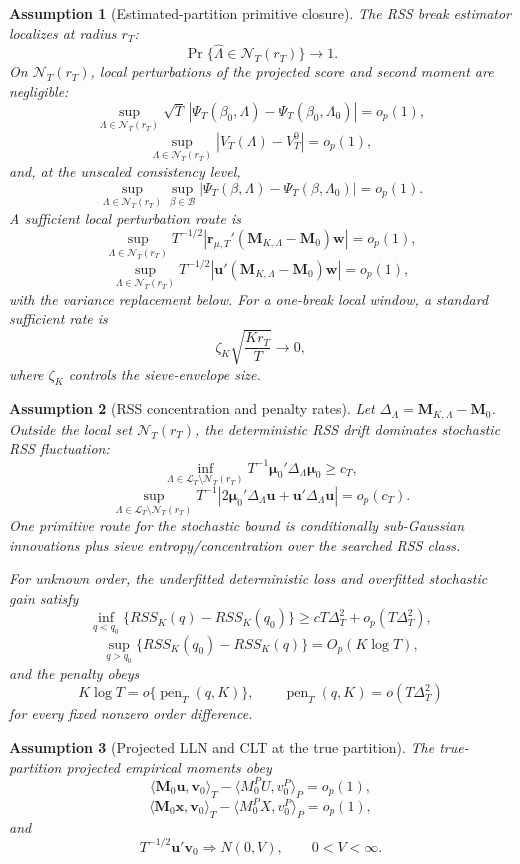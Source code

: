\documentclass[12pt]{article}
\numberwithin{equation}{section}
\newtheorem{assumption}{Assumption}
\theoremstyle{definition}
\newcommand{\op}{o_p}
\newcommand{\Op}{O_p}
\newcommand{\innerT}[2]{\langle #1,#2\rangle_T}
\newcommand{\innerP}[2]{\langle #1,#2\rangle_P}
\begin{document}
\begin{assumption}[Estimated-partition primitive closure]
\label{ass:directional-break-replacement}
The RSS break estimator localizes at radius \(r_T\):
\[
    \Pr\{\widehat\Lambda\in\mathcal N_T(r_T)\}\to1.
\]
On \(\mathcal N_T(r_T)\), local perturbations of the projected score and second
moment are negligible:
\[
    \sup_{\Lambda\in\mathcal N_T(r_T)}
    \sqrt T\,|\Psi_T(\beta_0,\Lambda)-\Psi_T(\beta_0,\Lambda_0)|=\op(1),
\]
\[
    \sup_{\Lambda\in\mathcal N_T(r_T)}
    |V_T(\Lambda)-V_T^0|=\op(1),
\]
and, at the unscaled consistency level,
\[
    \sup_{\Lambda\in\mathcal N_T(r_T)}\sup_{\beta\in\mathcal B}
    |\Psi_T(\beta,\Lambda)-\Psi_T(\beta,\Lambda_0)|=\op(1).
\]
A sufficient local perturbation route is
\[
    \sup_{\Lambda\in\mathcal N_T(r_T)}
    T^{-1/2}|\bm r_{\mu,T}'(\bm M_{K,\Lambda}-\bm M_0)\bm w|=\op(1),
\]
\[
    \sup_{\Lambda\in\mathcal N_T(r_T)}
    T^{-1/2}|\bm u'(\bm M_{K,\Lambda}-\bm M_0)\bm w|=\op(1),
\]
with the variance replacement below. For a one-break local window, a standard
sufficient rate is
\[
    \zeta_K\sqrt{\frac{Kr_T}{T}}\to0,
\]
where \(\zeta_K\) controls the sieve-envelope size.
\end{assumption}

\begin{assumption}[RSS concentration and penalty rates]
\label{ass:rss-localization-penalty}
Let \(\Delta_\Lambda=\bm M_{K,\Lambda}-\bm M_0\). Outside the local set
\(\mathcal N_T(r_T)\), the deterministic RSS drift dominates stochastic RSS
fluctuation:
\[
    \inf_{\Lambda\in\mathcal L_T\setminus\mathcal N_T(r_T)}
    T^{-1}\bm\mu_0'\Delta_\Lambda\bm\mu_0\ge c_T,
\]
\[
    \sup_{\Lambda\in\mathcal L_T\setminus\mathcal N_T(r_T)}
    T^{-1}|2\bm\mu_0'\Delta_\Lambda\bm u+\bm u'\Delta_\Lambda\bm u|=o_p(c_T).
\]
One primitive route for the stochastic bound is conditionally sub-Gaussian
innovations plus sieve entropy/concentration over the searched RSS class.

For unknown order, the underfitted deterministic loss and overfitted stochastic
gain satisfy
\[
    \inf_{q<q_0}\{RSS_K(q)-RSS_K(q_0)\}\ge cT\Delta_T^2+o_p(T\Delta_T^2),
\]
\[
    \sup_{q>q_0}\{RSS_K(q_0)-RSS_K(q)\}=\Op(K\log T),
\]
and the penalty obeys
\[
    K\log T=o\{\operatorname{pen}_T(q,K)\},
    \qquad
    \operatorname{pen}_T(q,K)=o(T\Delta_T^2)
\]
for every fixed nonzero order difference.
\end{assumption}

\begin{assumption}[Projected LLN and CLT at the true partition]
\label{ass:projected-lln-clt}
The true-partition projected empirical moments obey
\[
    \innerT{\bm M_0\bm u}{\bm v_0}
    -\innerP{M_0^PU}{v_0^P}=\op(1),
\]
\[
    \innerT{\bm M_0\bm x}{\bm v_0}
    -\innerP{M_0^PX}{v_0^P}=\op(1),
\]
and
\[
    T^{-1/2}\bm u'\bm v_0\Rightarrow N(0,V),
    \qquad 0<V<\infty.
\]
\end{assumption}
\end{document}
